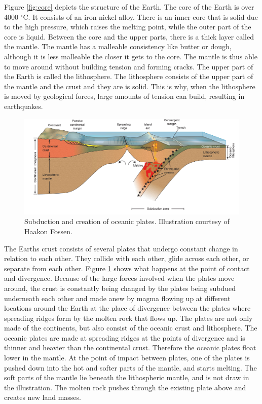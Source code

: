 \documentclass[a4paper,12pt]{report}
\begin{document}
Figure \ref{fig:core} depicts the structure of the Earth. The core of the Earth is over 4000 $^\circ$C. It consists of an iron-nickel alloy. There is an inner core that is solid due to the high pressure, which raises the melting point, while the outer part of the core is liquid. Between the core and the upper parts, there is a thick layer called the mantle. The mantle has a malleable consistency like butter or dough, although it is less malleable the closer it gets to the core. The mantle is thus able to move around without building tension and forming cracks. The upper part of the Earth is called the lithosphere. The lithosphere consists of the upper part of the mantle and the crust and they are is solid. This is why, when the lithosphere is moved by geological forces, large amounts of tension can build, resulting in earthquakes.

\begin{figure}[t]
 \includegraphics[width=\linewidth]{thesis/geo/english/subduksjon.jpg}
 \caption{Subduction and creation of oceanic plates. Illustration courtesy of Haakon Fossen.}
 \label{fig:fig99subduction}
\end{figure}

The Earths crust consists of several plates that undergo constant change in relation to each other. They collide with each other, glide across each other, or separate from each other. Figure \ref{fig:fig99subduction} shows what happens at the point of contact and divergence.  Because of the large forces involved when the plates move around, the crust is constantly being changed by the plates being subdued underneath each other and made anew by magma flowing up at different locations around the Earth at the place of divergence between the plates where spreading ridges form by the molten rock that flows up. The plates are not only made of the continents, but also consist of the oceanic crust and lithosphere. The oceanic plates are made at spreading ridges at the points of divergence and is thinner and heavier than the continental crust. Therefore the oceanic plates float lower in the mantle. At the point of impact between plates, one of the plates is pushed down into the hot and softer parts of the mantle, and starts melting. The soft parts of the mantle lie beneath the lithospheric mantle, and is not draw in the illustration. The molten rock pushes through the existing plate above and creates new land masses.
\end{document}
